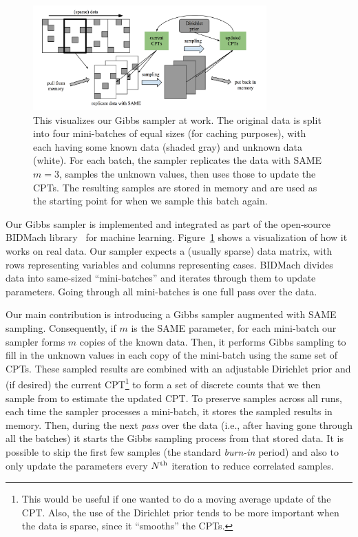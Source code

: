 \documentclass{article} %
\begin{document}
\begin{figure}[t]
\centering
\includegraphics[width=0.8\textwidth]{fig_BIDMach_final}
\caption{This visualizes our Gibbs sampler at work. The original data is split into four
mini-batches of equal sizes (for caching purposes), with each having some known data (shaded gray)
and unknown data (white). For each batch, the sampler replicates the data with SAME $m=3$, samples
the unknown values, then uses those to update the CPTs. The resulting samples are stored in memory
and are used as the starting point for when we sample this batch again.}
\label{fig:BIDMach}
\end{figure}

Our Gibbs sampler is implemented and integrated as part of the open-source BIDMach
library~\citep{bidmach} for machine learning.  Figure~\ref{fig:BIDMach} shows a visualization of how
it works on real data. Our sampler expects a (usually sparse) data matrix, with rows representing
variables and columns representing cases. BIDMach divides data into same-sized ``mini-batches'' and
iterates through them to update parameters. Going through all mini-batches is one full pass over the
data.

Our main contribution is introducing a Gibbs sampler augmented with SAME sampling.  Consequently,
if $m$ is the SAME parameter, for each mini-batch our sampler forms $m$ copies of the known data.
Then, it performs Gibbs sampling to fill in the unknown values in each copy of the mini-batch using
the same set of CPTs.  These sampled results are combined with an adjustable Dirichlet prior and (if
desired) the current CPT\footnote{This would be useful if one wanted to do a moving average update
of the CPT. Also, the use of the Dirichlet prior tends to be more important when the data is sparse,
since it ``smooths'' the CPTs.} to form a set of discrete counts that we then sample from to
estimate the updated CPT. To preserve samples across all runs, each time the sampler processes a
mini-batch, it stores the sampled results in memory.  Then, during the next \emph{pass} over the
data (i.e., after having gone through all the batches) it starts the Gibbs sampling process from
that stored data. It is possible to skip the first few samples (the standard \emph{burn-in} period)
and also to only update the parameters every $N^{\rm th}$ iteration to reduce correlated samples.
\end{document}
